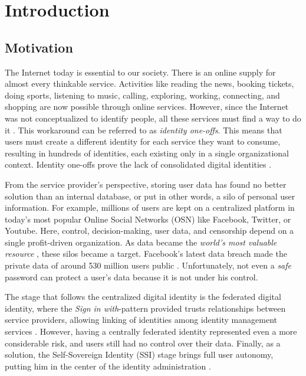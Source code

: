 \chapter{Introduction}
\label{cha:introduction}

\section{Motivation}

The Internet today is essential to our society. There is an online supply for almost every thinkable service. Activities like reading the news, booking tickets, doing sports, listening to music, calling, exploring, working, connecting, and shopping are now possible through online services. However, since the Internet was not conceptualized to identify people, all these services must find a way to do it \cite{Tobin_Reed_Windley_Foundation_2017}. This workaround can be referred to as \emph{identity one-offs}. This means that users must create a different identity for each service they want to consume, resulting in hundreds of identities, each existing only in a single organizational context. Identity one-offs prove the lack of consolidated digital identities \cite{macinnis_2019}.

From the service provider's perspective, storing user data has found no better solution than an internal database, or put in other words, a silo of personal user information. For example, millions of users are kept on a centralized platform in today's most popular Online Social Networks (OSN) like Facebook, Twitter, or Youtube. Here, control, decision-making, user data, and censorship depend on a single profit-driven organization. As data became the \emph{world's most valuable resource} \cite{parkins_2017}, these silos became a target. Facebook's latest data breach made the private data of around 530 million users public \cite{holmes_2021}. Unfortunately, not even a \emph{safe} password can protect a user's data because it is not under his control. 

The stage that follows the centralized digital identity is the federated digital identity, where the \emph{Sign in with}-pattern provided trusts relationships between service providers, allowing linking of identities among identity management services \cite{1556498}. However, having a centrally federated identity represented even a more considerable risk, and users still had no control over their data. Finally, as a solution, the Self-Sovereign Identity (SSI) stage brings full user autonomy, putting him in the center of the identity administration \cite{allen_2016}.  

